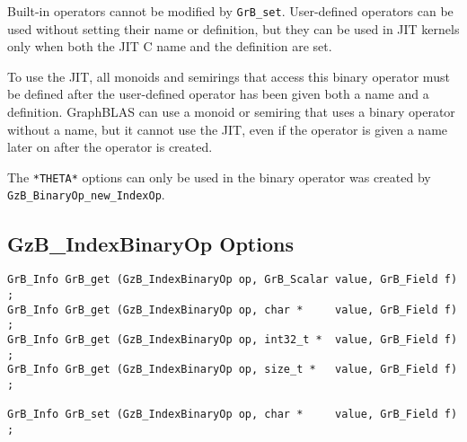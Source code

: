 Built-in operators cannot be modified by \verb'GrB_set'.  User-defined
operators can be used without setting their name or definition, but they can be
used in JIT kernels only when both the JIT C name and the definition are set.

To use the JIT, all monoids and semirings that access this binary operator must
be defined after the user-defined operator has been given both a name and a
definition.  GraphBLAS can use a monoid or semiring that uses a binary operator
without a name, but it cannot use the JIT, even if the operator is given a name
later on after the operator is created.

The \verb'*THETA*' options can only be used in the binary operator was
created by \verb'GzB_BinaryOp_new_IndexOp'.

\newpage
\subsection{{\sf GzB\_IndexBinaryOp} Options}
\label{get_set_idxbinop}

\begin{mdframed}[userdefinedwidth=6in]
{\footnotesize
\begin{verbatim}
GrB_Info GrB_get (GzB_IndexBinaryOp op, GrB_Scalar value, GrB_Field f) ;
GrB_Info GrB_get (GzB_IndexBinaryOp op, char *     value, GrB_Field f) ;
GrB_Info GrB_get (GzB_IndexBinaryOp op, int32_t *  value, GrB_Field f) ;
GrB_Info GrB_get (GzB_IndexBinaryOp op, size_t *   value, GrB_Field f) ;

GrB_Info GrB_set (GzB_IndexBinaryOp op, char *     value, GrB_Field f) ;
\end{verbatim}
}\end{mdframed}

